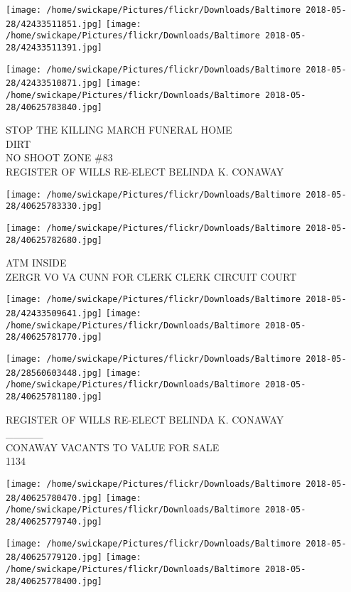 \documentclass[10pt,letterpaper]{article}
\begin{document}
\texttt{[image: /home/swickape/Pictures/flickr/Downloads/Baltimore 2018-05-28/42433511851.jpg]}
\texttt{[image: /home/swickape/Pictures/flickr/Downloads/Baltimore 2018-05-28/42433511391.jpg]}

\texttt{[image: /home/swickape/Pictures/flickr/Downloads/Baltimore 2018-05-28/42433510871.jpg]}
\texttt{[image: /home/swickape/Pictures/flickr/Downloads/Baltimore 2018-05-28/40625783840.jpg]}

STOP THE KILLING MARCH FUNERAL HOME\\
DIRT\\
NO SHOOT ZONE \#83\\
REGISTER OF WILLS RE{-}ELECT BELINDA K. CONAWAY
\pagebreak

\texttt{[image: /home/swickape/Pictures/flickr/Downloads/Baltimore 2018-05-28/40625783330.jpg]}

\vspace{0.25in}
\texttt{[image: /home/swickape/Pictures/flickr/Downloads/Baltimore 2018-05-28/40625782680.jpg]}

ATM INSIDE\\
ZERGR VO VA CUNN FOR CLERK CLERK CIRCUIT COURT
\pagebreak

\texttt{[image: /home/swickape/Pictures/flickr/Downloads/Baltimore 2018-05-28/42433509641.jpg]}
\texttt{[image: /home/swickape/Pictures/flickr/Downloads/Baltimore 2018-05-28/40625781770.jpg]}

\texttt{[image: /home/swickape/Pictures/flickr/Downloads/Baltimore 2018-05-28/28560603448.jpg]}
\texttt{[image: /home/swickape/Pictures/flickr/Downloads/Baltimore 2018-05-28/40625781180.jpg]}

REGISTER OF WILLS RE{-}ELECT BELINDA K. CONAWAY\\
\_\_\_\_\_\\
CONAWAY VACANTS TO VALUE FOR SALE\\
1134
\pagebreak

\texttt{[image: /home/swickape/Pictures/flickr/Downloads/Baltimore 2018-05-28/40625780470.jpg]}
\texttt{[image: /home/swickape/Pictures/flickr/Downloads/Baltimore 2018-05-28/40625779740.jpg]}

\texttt{[image: /home/swickape/Pictures/flickr/Downloads/Baltimore 2018-05-28/40625779120.jpg]}
\texttt{[image: /home/swickape/Pictures/flickr/Downloads/Baltimore 2018-05-28/40625778400.jpg]}
\end{document}
